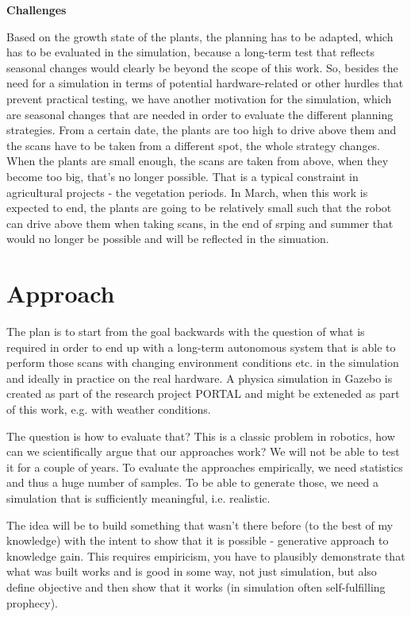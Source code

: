 \documentclass[german, master, expose, latin1]{base/thesis_KBS}
\begin{document}
\textbf{Challenges}\newline

Based on the growth state of the plants, the planning has to be adapted, which has to be evaluated in the simulation, because a long-term test that reflects
seasonal changes would clearly be beyond the scope of this work. So, besides the need for a simulation in terms of potential hardware-related or other hurdles
that prevent practical testing, we have another motivation for the simulation, which are seasonal changes that are needed in order to evaluate the different
planning strategies. From a certain date, the plants are too high to drive above them and the scans have to be taken from a different spot, the whole strategy changes.
When the plants are small enough, the scans are taken from above, when they become too big, that's no longer possible.
That is a typical constraint in agricultural projects - the vegetation periods.
In March, when this work is expected to end, the plants are going to be relatively small such that the robot can drive above them when taking
scans, in the end of srping and summer that would no longer be possible and will be reflected in the simuation.

\section{Approach}

The plan is to start from the goal backwards with the question of what is required in order to end up with a long-term autonomous system that is
able to perform those scans with changing environment conditions etc. in the simulation and ideally in practice on the real hardware.
A physica simulation in Gazebo is created as part of the research project PORTAL and might be exteneded as part of this work, e.g. with weather conditions.\newline

The question is how to evaluate that? This is a classic problem in robotics, how can we scientifically argue that our approaches work? 
We will not be able to test it for a couple of years.
To evaluate the approaches empirically, we need statistics and thus a huge number of samples. To be able to generate those, we need a simulation
that is sufficiently meaningful, i.e. realistic.\newline

The idea will be to build something that wasn't there before (to the best of my knowledge) with the intent to show that it is possible - generative approach to knowledge gain.
This requires empiricism, you have to plausibly demonstrate that what was built works and is good in some way, not just simulation, but also define objective and then 
show that it works (in simulation often self-fulfilling prophecy).\newline
\end{document}
